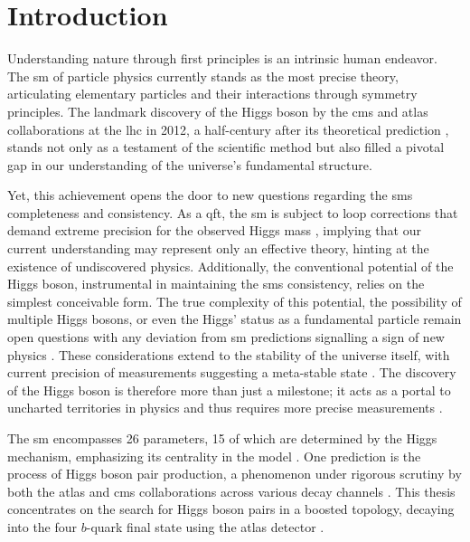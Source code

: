 \chapter{Introduction}
Understanding nature through first principles is an intrinsic human endeavor. The \ac{sm} of particle physics currently stands as the most precise theory, articulating elementary particles and their interactions through symmetry principles. The landmark discovery of the Higgs boson by the \ac{cms} \citep{higgs-cms} and \ac{atlas} \citep{higgs} collaborations at the \ac{lhc} in 2012, a half-century after its theoretical prediction \citep{PhysRevLett.13.321,PhysRevLett.13.508}, stands not only as a testament of the scientific method but also filled a pivotal gap in our understanding of the universe's fundamental structure.

Yet, this achievement opens the door to new questions regarding the \acp{sm} completeness and consistency. As a \ac{qft}, the \ac{sm} is subject to loop corrections that demand extreme precision for the observed Higgs mass \citep{peskin2016trail}, implying that our current understanding may represent only an effective theory, hinting at the existence of undiscovered physics. Additionally, the conventional potential of the Higgs boson, instrumental in maintaining the \acp{sm} consistency, relies on the simplest conceivable form. The true complexity of this potential, the possibility of multiple Higgs bosons, or even the Higgs' status as a fundamental particle remain open questions with any deviation from \ac{sm} predictions signalling a sign of new physics \citep{PhysRevD.101.075023}. These considerations extend to the stability of the universe itself, with current precision of measurements suggesting a meta-stable state \citep{Buttazzo:2013uya}. The discovery of the Higgs boson is therefore more than just a milestone; it acts as a portal to uncharted territories in physics and thus requires more precise measurements \citep{dawsona2022report}.

The \ac{sm} encompasses 26 parameters, 15 of which are determined by the Higgs mechanism, emphasizing its centrality in the model \citep{thomson2013modern}. One prediction is the process of Higgs boson pair production, a phenomenon under rigorous scrutiny by both the \ac{atlas} and \ac{cms} collaborations across various decay channels \citep{GOUZEVITCH2020100039}. This thesis concentrates on the search for Higgs boson pairs in a boosted topology, decaying into the four $b$-quark final state using the \ac{atlas} detector \citep{atlas2018search}.

